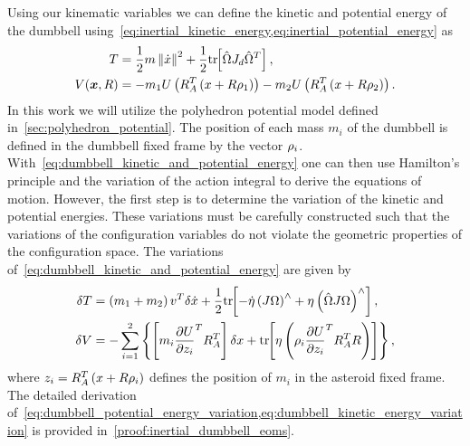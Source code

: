 Using our kinematic variables we can define the kinetic and potential energy of the dumbbell using~\cref{eq:inertial_kinetic_energy,eq:inertial_potential_energy} as
\begin{subequations}\label{eq:dumbbell_kinetic_and_potential_energy}
\begin{align}
    T &= \frac{1}{2} m \left\| \dot{x} \right\|^2 + \frac{1}{2} \mathrm{tr}\negthickspace\left[ \hat{\Omega} J_d \hat{\Omega}^T \right] , \label{eq:dumbbell_kinetic_energy}\\
    V( \bm{x}, R ) &=  - m_1 U \left( R_A^T \left( x + R \rho_1 \right) \right) - m_2 U \left( R_A^T \left( x + R \rho_2 \right) \right). \label{eq:dumbbell_potential_energy}
\end{align}
\end{subequations}     
In this work we will utilize the polyhedron potential model defined in~\cref{sec:polyhedron_potential}.
The position of each mass \(m_i\) of the dumbbell is defined in the dumbbell fixed frame by the vector \(\rho_i\). 
With~\cref{eq:dumbbell_kinetic_and_potential_energy} one can then use Hamilton's principle  and the variation of the action integral to derive the equations of motion.
However, the first step is to determine the variation of the kinetic and potential energies.
These variations must be carefully constructed such that the variations of the configuration variables do not violate the geometric properties of the configuration space.
The variations of~\cref{eq:dumbbell_kinetic_and_potential_energy} are given by
\begin{align} 
    \delta T &= \left( m_1 + m_2 \right) v^T \delta \dot{x} + \frac{1}{2} \mathrm{tr}\negthickspace\left[ - \dot{\eta} \left( J \Omega \right)^\wedge + \eta \left( \hat{\Omega} J \Omega \right)^\wedge  \right], \label{eq:dumbbell_kinetic_energy_variation} \\
    \delta V &= - \sum_{i=1}^2 \left\{  \left[ m_i \frac{\partial U}{\partial z_i}^T R_A^T  \right] \delta x +  \mathrm{tr}\negthickspace\left[ \eta \left( \rho_i \frac{\partial U}{\partial z_i}^T R_A^T R  \right)  \right] \right\},\label{eq:dumbbell_potential_energy_variation}
\end{align}
where \( z_i = R_A^T \left( x + R \rho_i \right) \) defines the position of \( m_i \) in the asteroid fixed frame.
The detailed derivation of~\cref{eq:dumbbell_potential_energy_variation,eq:dumbbell_kinetic_energy_variation} is provided in~\cref{proof:inertial_dumbbell_eoms}.

